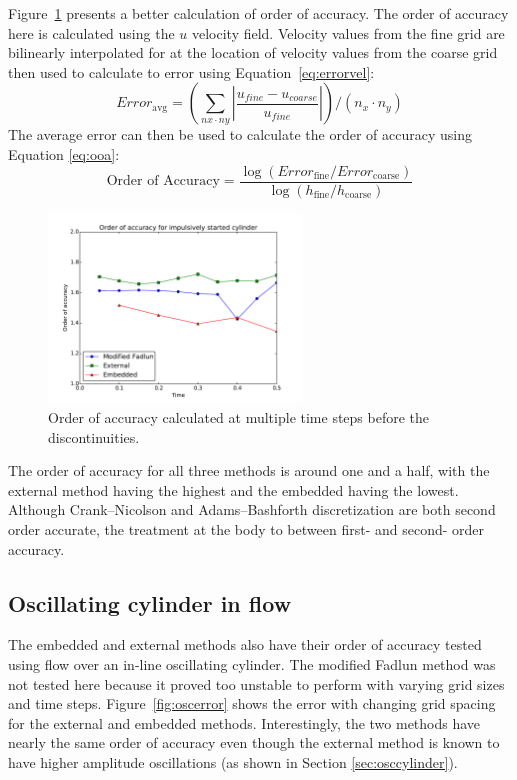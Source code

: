 Figure~\ref{fig:cyerror2} presents a better calculation of order of accuracy. 
The order of accuracy here is calculated using the $u$ velocity field. 
Velocity values from the fine grid are bilinearly interpolated for at the location of velocity values from the coarse grid then used to calculate to error using Equation~\eqref{eq:errorvel}:
\begin{equation}
Error_{\text{avg}}=\left(\sum_{nx\cdot ny}^{} \left|\frac{u_{fine}-u_{coarse}}{u_{fine}}\right|\right)/(n_x\cdot n_y)
\label{eq:errorvel}
\end{equation}
The average error can then be used to calculate the order of accuracy using Equation \eqref{eq:ooa}: 
\begin{equation}
\text{Order of Accuracy} = \frac{\log \left(Error_{\text{fine}}/Error_{\text{coarse}}\right)}{\log \left(h_{\text{fine}}/h_{\text{coarse}}\right)}\label{eq:ooa}
\end{equation}

\begin{figure}[H]
	\centering
	\includegraphics[width=0.6\textwidth]{error_order_2_plt}
	\caption{Order of accuracy calculated at multiple time steps before the discontinuities.}
	\label{fig:cyerror2}
\end{figure}
The order of accuracy for all three methods is around one and a half, with the external method having the highest and the embedded having the lowest. 
Although Crank--Nicolson and Adams--Bashforth discretization are both second order accurate, the treatment at the body to between first- and second- order accuracy. 


\subsection{Oscillating cylinder in flow}
The embedded and external methods also have their order of accuracy tested using flow over an in-line oscillating cylinder. 
The modified Fadlun method was not tested here because it proved too unstable to perform with varying grid sizes and time steps. 
Figure~\ref{fig:oscerror} shows the error with changing grid spacing for the external and embedded methods. 
Interestingly, the two methods have nearly the same order of accuracy even though the external method is known to have higher amplitude oscillations (as shown in Section \ref{sec:osccylinder}). 

